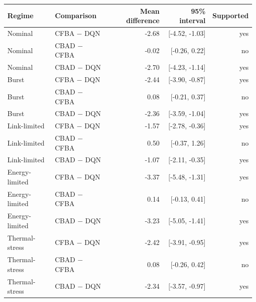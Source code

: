 \begin{tabular}{llrrr}
\toprule
Regime & Comparison & Mean difference & 95\% interval & Supported \\
\midrule
Nominal & CFBA $-$ DQN & -2.68 & [-4.52, -1.03] & yes \\
Nominal & CBAD $-$ CFBA & -0.02 & [-0.26, 0.22] & no \\
Nominal & CBAD $-$ DQN & -2.70 & [-4.23, -1.14] & yes \\
Burst & CFBA $-$ DQN & -2.44 & [-3.90, -0.87] & yes \\
Burst & CBAD $-$ CFBA & 0.08 & [-0.21, 0.37] & no \\
Burst & CBAD $-$ DQN & -2.36 & [-3.59, -1.04] & yes \\
Link-limited & CFBA $-$ DQN & -1.57 & [-2.78, -0.36] & yes \\
Link-limited & CBAD $-$ CFBA & 0.50 & [-0.37, 1.26] & no \\
Link-limited & CBAD $-$ DQN & -1.07 & [-2.11, -0.35] & yes \\
Energy-limited & CFBA $-$ DQN & -3.37 & [-5.48, -1.31] & yes \\
Energy-limited & CBAD $-$ CFBA & 0.14 & [-0.13, 0.41] & no \\
Energy-limited & CBAD $-$ DQN & -3.23 & [-5.05, -1.41] & yes \\
Thermal-stress & CFBA $-$ DQN & -2.42 & [-3.91, -0.95] & yes \\
Thermal-stress & CBAD $-$ CFBA & 0.08 & [-0.26, 0.42] & no \\
Thermal-stress & CBAD $-$ DQN & -2.34 & [-3.57, -0.97] & yes \\
\bottomrule
\end{tabular}